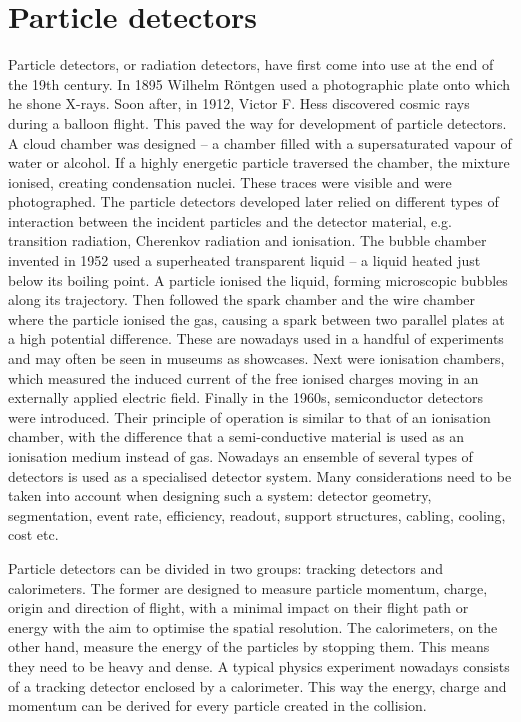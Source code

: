\section{Particle detectors}
Particle detectors, or radiation detectors, have first come into use at the end of the 19th century. In 1895 Wilhelm R\"ontgen used a photographic plate onto which he shone X-rays. Soon after, in 1912, Victor F. Hess discovered cosmic rays during a balloon flight. This paved the way for development of particle detectors. A cloud chamber was designed -- a chamber filled with a supersaturated vapour of water or alcohol. If a highly energetic particle traversed the chamber, the mixture ionised, creating condensation nuclei. These traces were visible and were photographed. The particle detectors developed later relied on different types of interaction between the incident particles and the detector material, e.g. transition radiation, Cherenkov radiation and ionisation. The bubble chamber invented in 1952 used a superheated transparent liquid -- a liquid heated just below its boiling point. A particle ionised the liquid, forming microscopic bubbles along its trajectory. Then followed the spark chamber and the wire chamber where the particle ionised the gas, causing a spark between two parallel plates at a high potential difference. These are nowadays used in a handful of experiments and may often be seen in museums as showcases. Next were ionisation chambers, which measured the induced current of the free ionised charges moving in an externally applied electric field. Finally in the 1960s, semiconductor detectors were introduced. Their principle of operation is similar to that of an ionisation chamber, with the difference that a semi-conductive material is used as an ionisation medium instead of gas. Nowadays an ensemble of several types of detectors is used as a specialised detector system. Many considerations need to be taken into account when designing such a system: detector geometry, segmentation, event rate, efficiency, readout, support structures, cabling, cooling, cost etc.

Particle detectors can be divided in two groups: tracking detectors and calorimeters. The former are designed to measure  particle momentum, charge, origin and direction of flight, with a minimal impact on their flight path or energy with the aim to optimise the spatial resolution. The calorimeters, on the other hand, measure the energy of the particles by stopping them. This means they need to be heavy and dense. A typical physics experiment nowadays consists of a tracking detector enclosed by a calorimeter. This way the energy, charge and momentum can be derived for every particle created in the collision.





